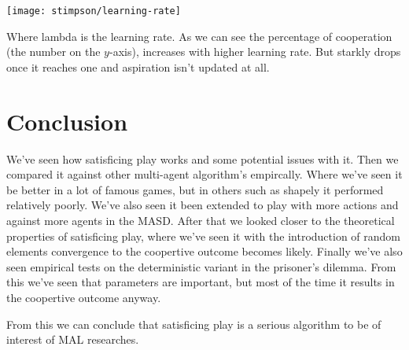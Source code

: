 \noindent
\texttt{[image: stimpson/learning-rate]}

\cleared Where lambda is the learning rate. As we can see the percentage of cooperation
(the number on the $y$-axis), increases with higher learning rate. But starkly
drops once it reaches one and aspiration isn't updated at all.


\section{Conclusion}
\cleared 
We've seen how satisficing play works and some potential issues with it.
Then we compared it against other multi-agent
algorithm's empircally. Where we've
seen it be better in a lot of famous games, but in others such as shapely it
performed relatively poorly. We've also seen it been extended to play
with more actions and against more agents in the MASD.
After that we looked closer to the theoretical properties
of satisficing play, where we've seen it with the introduction of random elements
convergence to the coopertive outcome becomes likely.
Finally we've also seen empirical tests
on the deterministic variant in the prisoner's dilemma. From this we've seen
that parameters are important, but most of the time it results in the coopertive
outcome anyway.

\cleared From this we can conclude that satisficing play is a serious algorithm to be of
interest of MAL researches.



\address{Jappie Klooster\\
  Dept. of Informatics\\
  Universiteit Utrecht\\
  The Netherlands\\}

